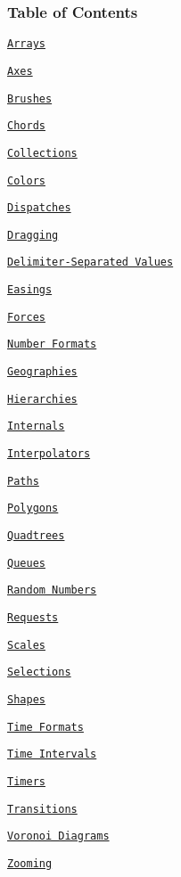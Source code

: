 \subsubsection*{Table of Contents}


\begin{DoxyItemize}
\item \href{#arrays-d3-array}{\tt Arrays}
\item \href{#axes-d3-axis}{\tt Axes}
\item \href{#brushes-d3-brush}{\tt Brushes}
\item \href{#chords-d3-chord}{\tt Chords}
\item \href{#collections-d3-collection}{\tt Collections}
\item \href{#colors-d3-color}{\tt Colors}
\item \href{#dispatches-d3-dispatch}{\tt Dispatches}
\item \href{#dragging-d3-drag}{\tt Dragging}
\item \href{#delimiter-separated-values-d3-dsv}{\tt Delimiter-\/\+Separated Values}
\item \href{#easings-d3-ease}{\tt Easings}
\item \href{#forces-d3-force}{\tt Forces}
\item \href{#number-formats-d3-format}{\tt Number Formats}
\item \href{#geographies-d3-geo}{\tt Geographies}
\item \href{#hierarchies-d3-hierarchy}{\tt Hierarchies}
\item \href{#internals}{\tt Internals}
\item \href{#interpolators-d3-interpolate}{\tt Interpolators}
\item \href{#paths-d3-path}{\tt Paths}
\item \href{#polygons-d3-polygon}{\tt Polygons}
\item \href{#quadtrees-d3-quadtree}{\tt Quadtrees}
\item \href{#queues-d3-queue}{\tt Queues}
\item \href{#random-numbers-d3-random}{\tt Random Numbers}
\item \href{#requests-d3-request}{\tt Requests}
\item \href{#scales-d3-scale}{\tt Scales}
\item \href{#selections-d3-selection}{\tt Selections}
\item \href{#shapes-d3-shape}{\tt Shapes}
\item \href{#time-formats-d3-time-format}{\tt Time Formats}
\item \href{#time-intervals-d3-time}{\tt Time Intervals}
\item \href{#timers-d3-timer}{\tt Timers}
\item \href{#transitions-d3-transition}{\tt Transitions}
\item \href{#voronoi-diagrams-d3-voronoi}{\tt Voronoi Diagrams}
\item \href{#zooming-d3-zoom}{\tt Zooming}
\end{DoxyItemize}

